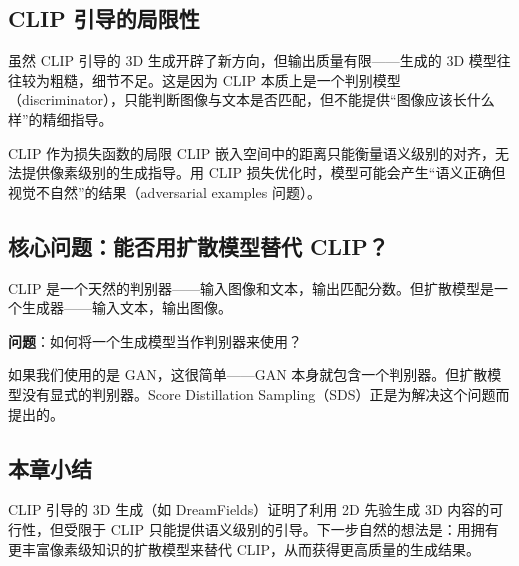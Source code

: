 \subsection{CLIP 引导的局限性}

虽然 CLIP 引导的 3D 生成开辟了新方向，但输出质量有限——生成的 3D 模型往往较为粗糙，细节不足。这是因为 CLIP 本质上是一个判别模型（discriminator），只能判断图像与文本是否匹配，但不能提供``图像应该长什么样''的精细指导。

\begin{warningbox}{CLIP 作为损失函数的局限}
CLIP 嵌入空间中的距离只能衡量语义级别的对齐，无法提供像素级别的生成指导。用 CLIP 损失优化时，模型可能会产生``语义正确但视觉不自然''的结果（adversarial examples 问题）。
\end{warningbox}

\subsection{核心问题：能否用扩散模型替代 CLIP？}

CLIP 是一个天然的判别器——输入图像和文本，输出匹配分数。但扩散模型是一个生成器——输入文本，输出图像。

\textbf{问题}：如何将一个生成模型当作判别器来使用？

如果我们使用的是 GAN，这很简单——GAN 本身就包含一个判别器。但扩散模型没有显式的判别器。Score Distillation Sampling（SDS）正是为解决这个问题而提出的。

\subsection{本章小结}

CLIP 引导的 3D 生成（如 DreamFields）证明了利用 2D 先验生成 3D 内容的可行性，但受限于 CLIP 只能提供语义级别的引导。下一步自然的想法是：用拥有更丰富像素级知识的扩散模型来替代 CLIP，从而获得更高质量的生成结果。

\newpage
